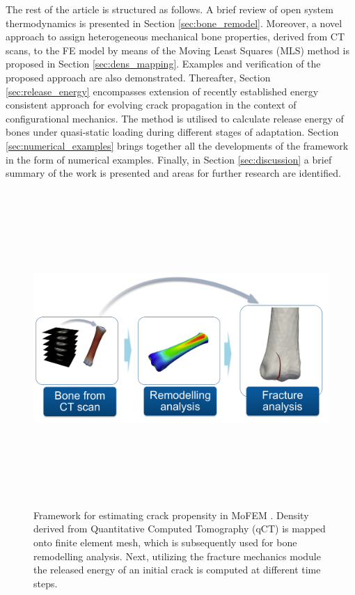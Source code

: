 \documentclass[11pt]{acmeArticle}
\numberwithin{equation}{section}
\begin{document}
The rest of the article is structured as follows.
A brief review of open system thermodynamics is presented in Section \ref{sec:bone_remodel}.
Moreover, a novel approach to assign heterogeneous mechanical bone properties, derived from CT scans,
to the FE model by means of the Moving Least Squares (MLS) method is proposed in Section \ref{sec:dens_mapping}.
Examples and verification of the proposed approach are also demonstrated. 
Thereafter, Section \ref{sec:release_energy} encompasses extension of recently established energy consistent approach 
for evolving crack propagation in the context of configurational mechanics. 
The method is utilised to calculate release energy of bones under quasi-static loading during different stages of adaptation. 
Section \ref{sec:numerical_examples} brings together all the developments of the framework in the form of numerical examples. 
Finally, in Section \ref{sec:discussion} a brief summary of the work is presented and areas for further research are identified.
\begin{figure}[h!]
\begin{center}
\includegraphics[width=12cm,height=12cm]{Figures/framework.png}
\caption{Framework for estimating crack propensity in MoFEM \citep{mofem2017}. Density derived from Quantitative Computed Tomography (qCT) is mapped onto finite element mesh, which is subsequently used for bone remodelling analysis. Next, utilizing the fracture mechanics module the released energy of an initial crack is computed at different time steps.}
\label{fig:framework}
\end{center}
\end{figure}
\end{document}
